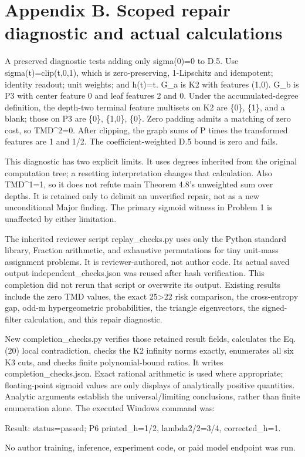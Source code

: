\documentclass[10pt]{article}
\begin{document}
\section*{Appendix B. Scoped repair diagnostic and actual calculations}
A preserved diagnostic tests adding only sigma(0)=0 to D.5. Use sigma(t)=clip(t,0,1), which is zero-preserving, 1-Lipschitz and idempotent; identity readout; unit weights; and h(t)=t. G\_a is K2 with features (1,0). G\_b is P3 with center feature 0 and leaf features 2 and 0. Under the accumulated-degree definition, the depth-two terminal feature multisets on K2 are \{0\}, \{1\}, and a blank; those on P3 are \{0\}, \{1,0\}, \{0\}. Zero padding admits a matching of zero cost, so TMD\textasciicircum{}2=0. After clipping, the graph sums of P times the transformed features are 1 and 1/2. The coefficient-weighted D.5 bound is zero and fails.\par
This diagnostic has two explicit limits. It uses degrees inherited from the original computation tree; a resetting interpretation changes that calculation. Also TMD\textasciicircum{}1=1, so it does not refute main Theorem 4.8’s unweighted sum over depths. It is retained only to delimit an unverified repair, not as a new unconditional Major finding. The primary sigmoid witness in Problem 1 is unaffected by either limitation.\par
The inherited reviewer script replay\_checks.py uses only the Python standard library, Fraction arithmetic, and exhaustive permutations for tiny unit-mass assignment problems. It is reviewer-authored, not author code. Its actual saved output independent\_checks.json was reused after hash verification. This completion did not rerun that script or overwrite its output. Existing results include the zero TMD values, the exact 25>22 risk comparison, the cross-entropy gap, odd-m hypergeometric probabilities, the triangle eigenvectors, the signed-filter calculation, and this repair diagnostic.\par
New completion\_checks.py verifies those retained result fields, calculates the Eq. (20) local contradiction, checks the K2 infinity norms exactly, enumerates all six K3 cuts, and checks finite polynomial-bound ratios. It writes completion\_checks.json. Exact rational arithmetic is used where appropriate; floating-point sigmoid values are only displays of analytically positive quantities. Analytic arguments establish the universal/limiting conclusions, rather than finite enumeration alone. The executed Windows command was:\par
{\ttfamily\footnotesize Result: status=passed; P6 printed\_h=1/2, lambda2/2=3/4, corrected\_h=1.}\par
No author training, inference, experiment code, or paid model endpoint was run.\par
\end{document}
